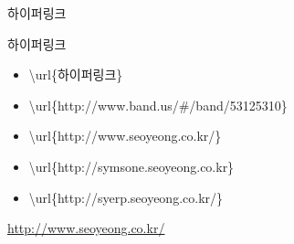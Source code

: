 \documentclass[ aspectratio=149,  14pt,blue,xcolor=pdftex,dvipsnames,table,handout,notes]{beamer}
\begin{document}

		\begin{frame}[t]{하이퍼링크}

			\begin{block} {하이퍼링크}
				\begin{itemize}
				\item [] \textbackslash  url\{하이퍼링크\}																\end{itemize}
			\end{block}

			\begin{example}
				\begin{itemize}
				\item \textbackslash url\{http://www.band.us/\#/band/53125310\} 
				\item \textbackslash url\{http://www.seoyeong.co.kr/\}
				\item \textbackslash url\{http://symsone.seoyeong.co.kr\}
				\item \textbackslash url\{http://syerp.seoyeong.co.kr/\}						
				\end{itemize}
			\end{example}

				\url{http://www.seoyeong.co.kr/}

		\end{frame}
\end{document}
